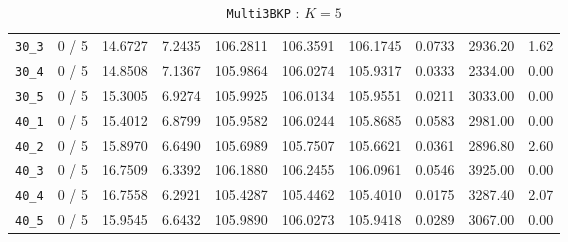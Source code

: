 \begin{table}[h!]
\begin{center}
\begin{tabular}{| c | c | c | c | c | c | c | c | c | c |}
\verb|30_3| & 0 / 5 & 14.6727 & 7.2435 & 106.2811 & 106.3591 & 106.1745 & 0.0733 & 2936.20 & 1.62\\ 
\verb|30_4| & 0 / 5 & 14.8508 & 7.1367 & 105.9864 & 106.0274 & 105.9317 & 0.0333 & 2334.00 & 0.00\\ 
\verb|30_5| & 0 / 5 & 15.3005 & 6.9274 & 105.9925 & 106.0134 & 105.9551 & 0.0211 & 3033.00 & 0.00\\ 
\verb|40_1| & 0 / 5 & 15.4012 & 6.8799 & 105.9582 & 106.0244 & 105.8685 & 0.0583 & 2981.00 & 0.00\\ 
\verb|40_2| & 0 / 5 & 15.8970 & 6.6490 & 105.6989 & 105.7507 & 105.6621 & 0.0361 & 2896.80 & 2.60\\ 
\verb|40_3| & 0 / 5 & 16.7509 & 6.3392 & 106.1880 & 106.2455 & 106.0961 & 0.0546 & 3925.00 & 0.00\\ 
\verb|40_4| & 0 / 5 & 16.7558 & 6.2921 & 105.4287 & 105.4462 & 105.4010 & 0.0175 & 3287.40 & 2.07\\ 
\verb|40_5| & 0 / 5 & 15.9545 & 6.6432 & 105.9890 & 106.0273 & 105.9418 & 0.0289 & 3067.00 & 0.00\\ 
\hline
\end{tabular}
\caption{\texttt{Multi3BKP} : $K=5$}
\label{table:multi:5}
\end{center}
\end{table}


